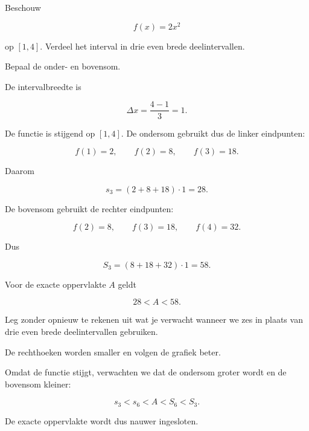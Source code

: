 \documentclass{ximera}
\begin{document}
\begin{oefening}{\oefB}

Beschouw

\[
f(x)=2x^2
\]

op \([1,4]\). Verdeel het interval in drie even brede deelintervallen.

\begin{center}
\end{center}

\begin{question}
Bepaal de onder- en bovensom.

\begin{oplossing}
De intervalbreedte is

\[
\Delta x=\frac{4-1}{3}=1.
\]

De functie is stijgend op \([1,4]\). De ondersom gebruikt dus de linker
eindpunten:

\[
f(1)=2,\qquad f(2)=8,\qquad f(3)=18.
\]

Daarom

\[
s_3=(2+8+18)\cdot1=\boxed{28}.
\]

De bovensom gebruikt de rechter eindpunten:

\[
f(2)=8,\qquad f(3)=18,\qquad f(4)=32.
\]

Dus

\[
S_3=(8+18+32)\cdot1=\boxed{58}.
\]

Voor de exacte oppervlakte \(A\) geldt

\[
\boxed{28<A<58}.
\]
\end{oplossing}
\end{question}

\begin{question}
Leg zonder opnieuw te rekenen uit wat je verwacht wanneer we zes in
plaats van drie even brede deelintervallen gebruiken.

\begin{oplossing}
De rechthoeken worden smaller en volgen de grafiek beter.

Omdat de functie stijgt, verwachten we dat de ondersom groter wordt en
de bovensom kleiner:

\[
s_3<s_6<A<S_6<S_3.
\]

De exacte oppervlakte wordt dus nauwer ingesloten.
\end{oplossing}
\end{question}

\end{oefening}
\end{document}
